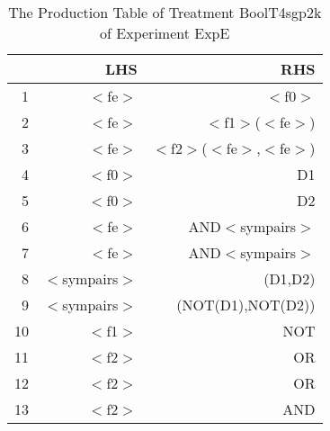 \begin{table}[ht]
\centering
\begin{tabular}{rrr}
  \hline
 & LHS & RHS \\ 
  \hline
1 & $<$fe$>$ & $<$f0$>$ \\ 
  2 & $<$fe$>$ & $<$f1$>$($<$fe$>$) \\ 
  3 & $<$fe$>$ & $<$f2$>$($<$fe$>$,$<$fe$>$) \\ 
  4 & $<$f0$>$ & D1 \\ 
  5 & $<$f0$>$ & D2 \\ 
  6 & $<$fe$>$ & AND$<$sympairs$>$ \\ 
  7 & $<$fe$>$ & AND$<$sympairs$>$ \\ 
  8 & $<$sympairs$>$ & (D1,D2) \\ 
  9 & $<$sympairs$>$ & (NOT(D1),NOT(D2)) \\ 
  10 & $<$f1$>$ & NOT \\ 
  11 & $<$f2$>$ & OR \\ 
  12 & $<$f2$>$ & OR \\ 
  13 & $<$f2$>$ & AND \\ 
   \hline
\end{tabular}
\caption{The Production Table of Treatment BoolT4sgp2k of Experiment ExpE} 
\end{table}
